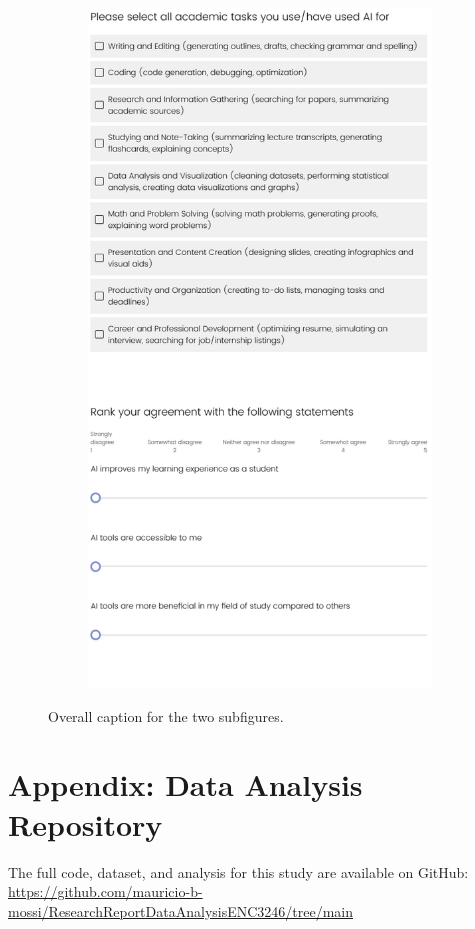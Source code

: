 \documentclass[12pt]{article}
\begin{document}
\begin{figure}[H]
\begin{subfigure}[b]{0.49\textwidth}
    \label{fig:subfig1a}
  \end{subfigure}
  \begin{subfigure}[b]{0.49\textwidth}
    \includegraphics[width=\textwidth]{s2.png} %
    \label{fig:subfig1b}
  \end{subfigure}
  \caption{Overall caption for the two subfigures.}
  \label{fig:subfigures1}
\end{figure}
\section{Appendix: Data Analysis Repository}
The full code, dataset, and analysis for this study are available on GitHub:
\url{https://github.com/mauricio-b-mossi/ResearchReportDataAnalysisENC3246/tree/main}
\end{document}
